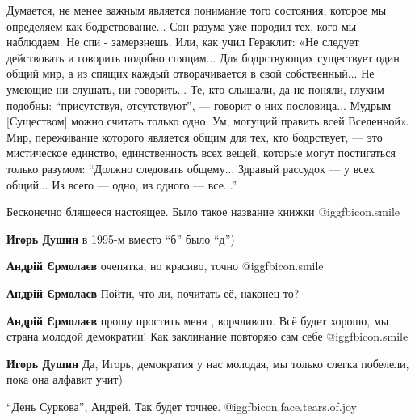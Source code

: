  
 
 
 
 
\zzSecCmt

\begin{itemize} %

Думается, не менее важным является понимание того состояния, которое мы
определяем как бодрствование... Сон разума уже породил тех, кого мы наблюдаем.
Не спи - замерзнешь. Или, как учил Гераклит: «Не следует действовать и говорить
подобно спящим... Для бодр­ствующих существует один общий мир, а из спящих
каждый отворачивается в свой собственный... Не умеющие ни слушать, ни
говорить... Те, кто слышали, да не поняли, глухим подобны: \enquote{присутствуя,
отсутствуют}, — говорит о них пословица... Мудрым [Существом] можно считать
только одно: Ум, могущий править всей Вселенной». Мир, переживание которого
является общим для тех, кто бодрствует, — это мистическое единство,
единственность всех вещей, которые могут постигаться только разумом: \enquote{Должно
следовать общему... Здравый рассудок — у всех общий... Из всего — одно, из
одного — все...}

Бесконечно блящееся настоящее. Было такое название книжки  @igg{fbicon.smile} 

\begin{itemize} %
\textbf{Игорь Душин} в 1995-м вместо \enquote{б} было \enquote{д})

\textbf{Андрій Єрмолаєв} очепятка, но красиво, точно  @igg{fbicon.smile} 

\textbf{Андрій Єрмолаєв} Пойти, что ли, почитать её, наконец-то?

\textbf{Андрій Єрмолаєв} прошу простить меня , ворчливого. Всё будет хорошо, мы страна молодой демократии! Как заклинание повторяю сам себе  @igg{fbicon.smile} 

\textbf{Игорь Душин} Да, Игорь, демократия у нас молодая, мы только слегка побелели, пока она алфавит учит)
\end{itemize} %

\enquote{День Суркова}, Андрей. Так будет точнее. @igg{fbicon.face.tears.of.joy} 


\end{itemize}
